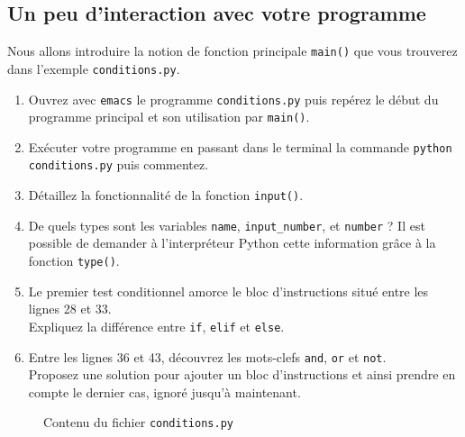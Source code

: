 \subsection{Un peu d'interaction avec votre programme}




Nous  allons introduire  la  notion de  fonction
principale   \texttt{main()}  que   vous   trouverez  dans   l'exemple
\texttt{conditions.py}.


\begin{enumerate}


\item  Ouvrez avec  \texttt{emacs} le  programme \texttt{conditions.py}
  puis repérez le début du programme principal et son utilisation par
  \texttt{main()}.

\item Exécuter votre programme en passant dans le terminal la commande
  \texttt{python conditions.py} puis commentez.


\item Détaillez la fonctionnalité de la fonction \texttt{input()}.

\item De quels types sont les variables \texttt{name}, \texttt{input\_number},
et \texttt{number} ? Il est possible de demander à l'interpréteur Python cette information grâce à la fonction \texttt{type()}.


\item Le premier test conditionnel amorce le bloc d'instructions
  situé entre  les lignes 28  et 33.\\ Expliquez la  différence entre
  \texttt{if}, \texttt{elif} et \texttt{else}.

\item  Entre   les  lignes  36   et  43,  découvrez  les   mots-clefs
  \texttt{and}, \texttt{or}  et \texttt{not}.\\ Proposez  une solution
  pour ajouter  un bloc  d'instructions et ainsi  prendre en  compte le
  dernier cas, ignoré jusqu'à maintenant.


\end{enumerate}


\begin{figure}  
  
  \caption{Contenu du fichier \texttt{conditions.py}}
  \label{polynome_conditions}
\end{figure}




